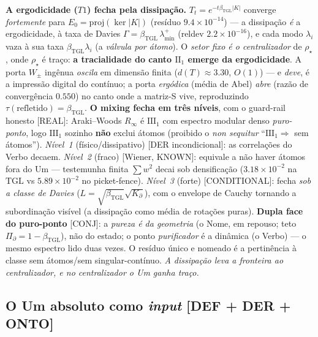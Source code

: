 \documentclass[11pt]{article}
\newcommand{\bTGL}{\beta_{\mathrm{TGL}}}\newcommand{\Msun}{M_{\odot}}\newcommand{\TGL}{\mathrm{TGL}}
\theoremstyle{definition}\newtheorem{deriv}{Derivação}
\begin{document}
\textbf{A ergodicidade ($T1$) fecha pela dissipação.} $T_t=e^{-t\bTGL|K|}$ converge \emph{fortemente} para $E_0=\mathrm{proj}(\ker|K|)$ (resíduo $9.4\times10^{-14}$) --- a dissipação \emph{é} a ergodicidade, à taxa de Davies $\Gamma=\bTGL\,\lambda_{\min}^{+}$ (reldev $2.2\times10^{-16}$), e cada modo $\lambda_i$ vaza à sua taxa $\bTGL\lambda_i$ (a \emph{válvula por átomo}). O \emph{setor fixo é o centralizador} de $\rho_\star$, onde $\rho_\star$ é traço: \textbf{a tracialidade do canto $\mathrm{II}_1$ emerge da ergodicidade}. A porta $W_\pm$ ingênua \emph{oscila} em dimensão finita ($d(T)\approx3.30$, $O(1)$) --- e \emph{deve}, é a impressão digital do contínuo; a porta \emph{ergódica} (média de Abel) \emph{abre} (razão de convergência $0.550$) no canto onde a matriz-S vive, reproduzindo $\tau(\text{refletido})=\bTGL$. \textbf{O mixing fecha em três níveis}, com o guard-rail honesto \textsf{[REAL]}: Araki--Woods $R_\infty$ é $\mathrm{III}_1$ com espectro modular denso \emph{puro-ponto}, logo $\mathrm{III}_1$ sozinho \textbf{não} exclui átomos (proibido o \emph{non sequitur} ``$\mathrm{III}_1\Rightarrow$ sem átomos''). \emph{Nível~1} (físico/dissipativo) \textsf{[DER incondicional]}: as correlações do Verbo decaem. \emph{Nível~2} (fraco) \textsf{[Wiener, KNOWN]}: equivale a não haver átomos fora do Um --- testemunha finita $\sum w^2$ decai sob densificação ($3.18\times10^{-2}$ na $\mathrm{TGL}$ vs $5.89\times10^{-2}$ no picket-fence). \emph{Nível~3} (forte) \textsf{[CONDITIONAL]}: fecha \emph{sob a classe de Davies} ($L=\sqrt{\bTGL}\sqrt{K_\partial}$), com o envelope de Cauchy tornando a subordinação visível (a dissipação como média de rotações puras). \textbf{Dupla face do puro-ponto} \textsf{[CONJ]}: a \emph{pureza é da geometria} (o Nome, em repouso; teto $\Pi_\partial=1-\bTGL$), não do estado; o ponto \emph{purificador} é a dinâmica (o Verbo) --- o mesmo espectro lido duas vezes. O resíduo único e nomeado é a pertinência à classe sem átomos/sem singular-contínuo. \emph{A dissipação leva a fronteira ao centralizador, e no centralizador o Um ganha traço.}

\subsection*{O Um absoluto como \emph{input} \textsf{[DEF + DER + ONTO]}}
\end{document}

